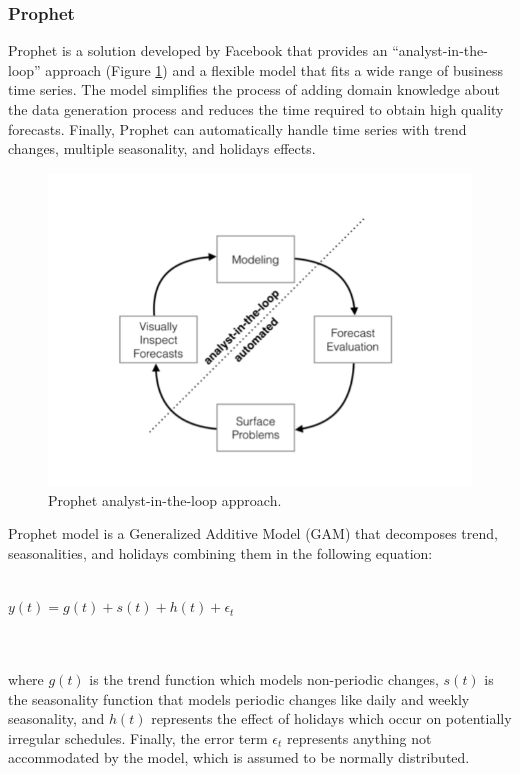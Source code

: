 \documentclass[a4paper, 12pt]{article} %
\begin{document}
	\subsubsection{Prophet } \label{sssec:prohet}
	Prophet \cite{FacebookProphet} is a solution developed by Facebook that provides an ``analyst-in-the-loop'' approach (Figure \ref{fig:analyst_in_the_loop}) and a flexible model that fits a wide range of business time series. The model simplifies the process of adding domain knowledge about the data generation process and reduces the time required to obtain high quality forecasts. Finally, Prophet can automatically handle time series with trend changes, multiple seasonality, and holidays effects.
	\begin{figure}
		\includegraphics[width=\linewidth]{img/sota_ts_fb_prophet.png}
		\caption{Prophet analyst-in-the-loop approach.}
		\label{fig:analyst_in_the_loop}
	\end{figure}
	Prophet model is a Generalized Additive Model (GAM) \cite{GAM} that decomposes trend, seasonalities, and holidays combining them in the following equation:\\\\
	\centerline{$y(t) = g(t) + s(t) + h(t) + \epsilon_t$}\\\\
	where $g(t)$ is the trend function which models non-periodic changes, $s(t)$ is the seasonality function that models periodic changes like daily and weekly seasonality, and $h(t)$ represents the effect of holidays which occur on potentially irregular schedules. Finally, the error term $\epsilon_t$ represents anything not accommodated by the model, which is assumed to be normally distributed. \\
\end{document}

